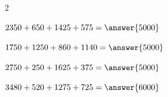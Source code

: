 \documentclass{ximera}
\begin{document}
\begin{oefening}{\oefB\ESS}
\begin{multicols}{2}
    \begin{question} \(2350+650+1425+575=\answer{5000}\) \end{question}
    
    \begin{question} \(1750+1250+860+1140=\answer{5000}\) \end{question}
    
    \begin{question} \(2750+250+1625+375=\answer{5000}\) \end{question}
    
    \begin{question} \(3480+520+1275+725=\answer{6000}\) \end{question}
    
    \end{multicols}
    
    \end{oefening}


\end{document}
